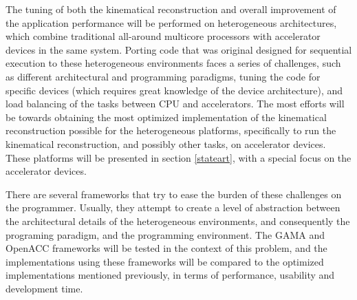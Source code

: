 The tuning of both the kinematical reconstruction and overall improvement of the application performance will be performed on heterogeneous architectures, which combine traditional all-around multicore processors with accelerator devices in the same system. Porting code that was original designed for sequential execution to these heterogeneous environments faces a series of challenges, such as different architectural and programming paradigms, tuning the code for specific devices (which requires great knowledge of the device architecture), and load balancing of the tasks between CPU and accelerators. The most efforts will be towards obtaining the most optimized implementation of the kinematical reconstruction possible for the heterogeneous platforms, specifically to run the kinematical reconstruction, and possibly other tasks, on accelerator devices. These platforms will be presented in section \ref{stateart}, with a special focus on the accelerator devices.

There are several frameworks that try to ease the burden of these challenges on the programmer. Usually, they attempt to create a level of abstraction between the architectural details of the heterogeneous environments, and consequently the programing paradigm, and the programming environment. The GAMA and OpenACC frameworks will be tested in the context of this problem, and the implementations using these frameworks will be compared to the optimized implementations mentioned previously, in terms of performance, usability and development time.

\newpage
